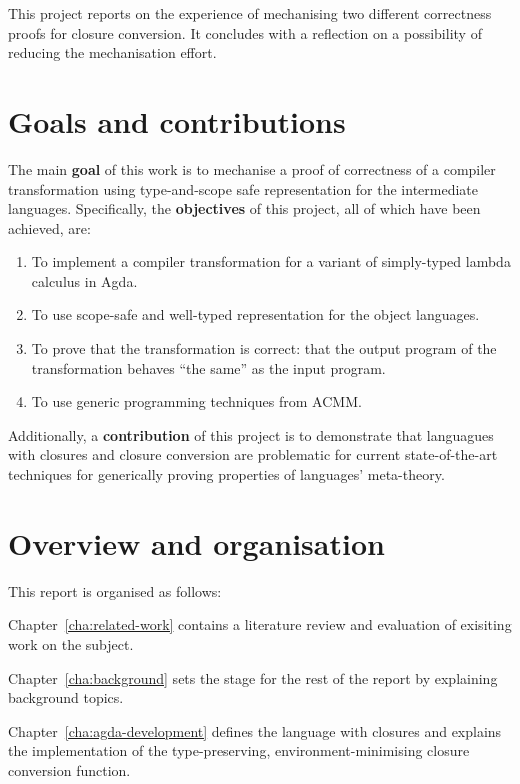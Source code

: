 \documentclass[bsc,frontabs,oneside,singlespacing,parskip,deptreport]{infthesis}
\theoremstyle{definition}
\theoremstyle{lemma}
\begin{document}
This project reports on the experience of mechanising two different
correctness proofs for closure conversion. It concludes with a
reflection on a possibility of reducing the mechanisation effort.

\section{Goals and contributions}
\label{sec:goals-contributions}

The main \textbf{goal} of this work is to mechanise a proof of
correctness of a compiler transformation using type-and-scope safe
representation for the intermediate languages. Specifically, the
\textbf{objectives} of this project, all of which have been achieved,
are:

\begin{enumerate}
\item To implement a compiler transformation for a variant of
  simply-typed lambda calculus in Agda.
\item To use scope-safe and well-typed representation for the object
  languages.
\item To prove that the transformation is correct: that the output
  program of the transformation behaves ``the same'' as the input
  program.
\item To use generic programming techniques from ACMM.
\end{enumerate}

Additionally, a \textbf{contribution} of this project is to
demonstrate that languagues with closures and closure conversion are
problematic for current state-of-the-art techniques for generically
proving properties of languages' meta-theory.

\section{Overview and organisation}
\label{sec:overv-organ}

This report is organised as follows:

Chapter~\ref{cha:related-work} contains a literature review and
evaluation of exisiting work on the subject.

Chapter~\ref{cha:background} sets the stage for the rest of the report
by explaining background topics.

Chapter~\ref{cha:agda-development} defines the language with closures
and explains the implementation of the type-preserving,
environment-minimising closure conversion function.
\end{document}
